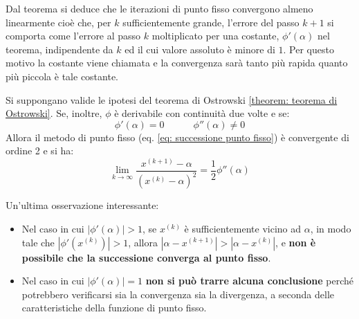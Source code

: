 \highspace
Dal teorema si deduce che le iterazioni di punto fisso convergono almeno linearmente cioè che, per $k$ sufficientemente grande, l'errore del passo $k+1$ si comporta come l'errore al passo $k$ moltiplicato per una costante, $\phi'\left(\alpha\right)$ nel teorema, indipendente da $k$ ed il cui valore assoluto è minore di $1$. Per questo motivo la costante viene chiamata  e la convergenza sarà tanto più rapida quanto più piccola è tale costante.

\begin{definitionbox}
    Si suppongano valide le ipotesi del teorema di Ostrowski \ref{theorem: teorema di Ostrowski}. Se, inoltre, $\phi$ è derivabile con continuità due volte e se:
    \begin{equation*}
        \phi'\left(\alpha\right) = 0 \hspace{3em} \phi''\left(\alpha\right) \ne 0
    \end{equation*}
    Allora il metodo di punto fisso (eq. \ref{eq: successione punto fisso}) è convergente di ordine 2 e si ha:
    \begin{equation}
        \displaystyle\lim_{k \rightarrow \infty} \dfrac{
            x^{\left(k+1\right)} - \alpha
        }{
            \left(x^{\left(k\right)} - \alpha\right)^{2}
        } = \dfrac{1}{2}\phi''\left(\alpha\right)
    \end{equation}
\end{definitionbox}

\newpage

\noindent
Un'ultima osservazione interessante:
\begin{itemize}
    \item Nel caso in cui $\left| \phi'\left(\alpha\right) \right| > 1$, se $x^{\left(k\right)}$ è sufficientemente vicino ad $\alpha$, in modo tale che $\left| \phi'\left(x^{\left(k\right)}\right)\right| > 1$, allora $\left| \alpha - x^{\left(k+1\right)} \right| > \left| \alpha - x^{\left(k\right)} \right|$, e \textbf{non è possibile che la successione converga al punto fisso}.

    \item Nel caso in cui $\left| \phi'\left(\alpha\right) \right| = 1$ \textbf{non si può trarre alcuna conclusione} perché potrebbero verificarsi sia la convergenza sia la divergenza, a seconda delle caratteristiche della funzione di punto fisso.
\end{itemize}